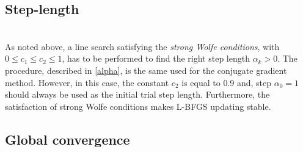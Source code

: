 \subsection{Step-length}\label{alpha_qn}
\\
As noted above, a line search satisfying the \emph{strong Wolfe conditions}, with $0 \leq c_1 \leq c_2 \leq 1$, has to be performed to find the right step length $\alpha_k > 0$. The procedure, described in \ref{alpha}, is the same used for the conjugate gradient method. However, in this case, the constant $c_2$ is equal to 0.9 and, step $\alpha_0 = 1$ should always be used as the initial trial step length. Furthermore, the satisfaction of strong Wolfe conditions makes L-BFGS updating stable.

\subsection{Global convergence}\label{global_convergence_qn}
\\
\\

